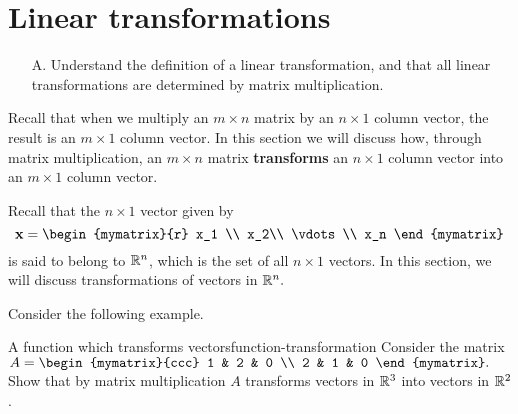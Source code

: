 \section{Linear transformations}

\begin{outcome}
\begin{enumerate}
\item[A.]  Understand the definition of a linear transformation, and that all linear transformations are determined by matrix multiplication.
\end{enumerate}
\end{outcome}

Recall that when we multiply an $m\times n$ matrix by an $n\times 1 $
column vector, the result is an $m\times 1$ column vector. In this
section we will discuss how, through matrix multiplication, an $m
\times n$ matrix \textbf{transforms} an $n\times 1$ column vector into
an $m \times 1$ column vector.

Recall that the $n \times 1$ vector given by
\begin{equation*}
\vect{x} = 
\begin{mymatrix}{r}
x_1 \\
x_2\\ 
\vdots \\
x_n
\end{mymatrix}
\end{equation*}
is said to belong to $\mathbb{R}^n$, which is the set of all $n \times 1$ vectors. In this section, we will discuss transformations of vectors in $\mathbb{R}^n.$ 

Consider the following example. 

\begin{example}{A function which transforms vectors}{function-transformation}
Consider the matrix $A = \begin{mymatrix}{ccc}
1 & 2 & 0 \\
2 & 1 & 0
\end{mymatrix} .$ 
Show that by matrix multiplication $A$ transforms vectors in $\mathbb{R}^3$ into vectors in $\mathbb{R}^2$.
\end{example}

